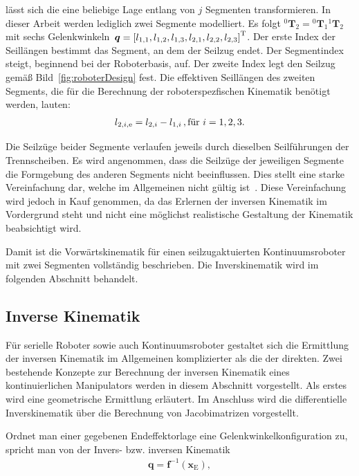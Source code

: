 lässt sich die eine beliebige Lage entlang von $j$ Segmenten transformieren. In dieser Arbeit werden lediglich zwei Segmente modelliert. Es folgt ${}^{0}\bm{T}_2 = {}^{0}\bm{T}_{1} {}^1\bm{T}_{2}$ mit sechs Gelenkwinkeln~$\bm{q} = \left[l_{1,1}, l_{1,2}, l_{1,3}, l_{2,1}, l_{2,2}, l_{2,3} \right]^{\mathrm{T}}$. 
Der erste Index der Seillängen bestimmt das Segment, an dem der Seilzug endet. Der Segmentindex steigt, beginnend bei der Roboterbasis, auf. Der zweite Index legt den Seilzug gemäß Bild~\ref{fig:roboterDesign} fest. Die effektiven Seillängen des zweiten Segments, die für die Berechnung der roboterspezfischen Kinematik benötigt werden, lauten:
\begin{align}
l_{2,i,\mathrm{e}} = l_{2,i} - l_{1,i}\text{\,}, \text{für~} i = 1,2,3.
\label{eq:effektiveLaenge}
\end{align}

Die Seilzüge beider Segmente verlaufen jeweils durch dieselben Seilführungen der Trennscheiben. Es wird angenommen, dass die Seilzüge der jeweiligen Segmente die Formgebung des anderen Segments nicht beeinflussen. Dies stellt eine starke Vereinfachung dar, welche im Allgemeinen nicht gültig ist~\cite{WIJ10}. Diese Vereinfachung wird jedoch in Kauf genommen, da das Erlernen der inversen Kinematik im Vordergrund steht und nicht eine möglichst realistische Gestaltung der Kinematik beabsichtigt wird. \newline

Damit ist die Vorwärtskinematik für einen seilzugaktuierten Kontinuumsroboter mit zwei Segmenten vollständig beschrieben. Die Inverskinematik wird im folgenden Abschnitt behandelt.


\subsection{Inverse Kinematik}
\label{subesc:inverseKinematik}

Für serielle Roboter sowie auch Kontinuumsroboter gestaltet sich die Ermittlung der inversen Kinematik im Allgemeinen komplizierter als die der direkten. Zwei bestehende Konzepte zur Berechnung der inversen Kinematik eines kontinuierlichen Manipulators werden in diesem Abschnitt vorgestellt. Als erstes wird eine geometrische Ermittlung erläutert. Im Anschluss wird die differentielle Inverskinematik über die Berechnung von Jacobimatrizen vorgestellt. \newline

Ordnet man einer gegebenen Endeffektorlage eine Gelenkwinkelkonfiguration zu, spricht man von der Invers- bzw. inversen Kinematik
\begin{align}
\bm{q}  = \bm{f}^{-1} \left( \bm{x}_{\mathrm{E}} \right), 
\label{eq:inverskinematik}
\end{align} 

